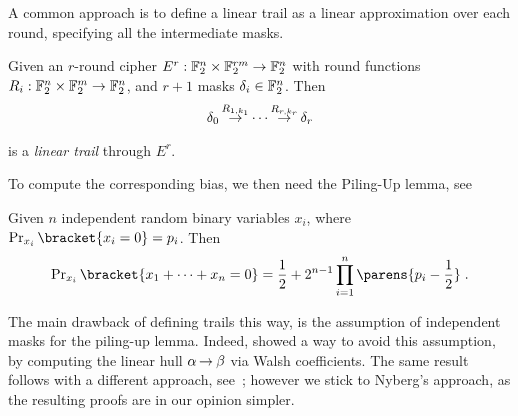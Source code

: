 A common approach is to define a linear trail as a linear approximation over each round, specifying all the intermediate masks.
\begin{definition}
    Given an $r$-round cipher $E^r : \mathbb{F}_2^n \times \mathbb{F}_2^{rm} \to \mathbb{F}_2^n$ with round functions $R_i : \mathbb{F}_2^n \times \mathbb{F}_2^m \to \mathbb{F}_2^n$, and $r+1$ masks $\delta_i \in \mathbb{F}_2^n$.
    Then
    \begin{equation*}
        \delta_0 \operatorname*{\rightarrow}^{R_{1,k_1}}_{} \cdots \operatorname*{\rightarrow}^{R_{r,k_r}}_{} \delta_{r}
    \end{equation*}
    is a \emph{linear trail} through $E^r$.
\end{definition}
To compute the corresponding bias, we then need the Piling-Up lemma, see~\cite[Lemma~3]{EC:Matsui93}
\begin{lemma}[Piling-Up]\label{lem:piling-up}
    Given $n$ independent random binary variables $x_i$, where $\Prob_{x_i}\bracket{x_i = 0} = p_i$.
    Then
    \begin{equation*}
        \Prob_{x_i}\bracket{x_1 + \cdots + x_n = 0} = \frac{1}{2} + 2^{n-1} \prod_{i=1}^n \parens{p_i - \frac{1}{2}}\;.
    \end{equation*}
\end{lemma}
The main drawback of defining trails this way, is the assumption of independent masks for the piling-up lemma.
Indeed, \textcite{EC:Nyberg93} showed a way to avoid this assumption, by computing the linear hull $\alpha \operatorname*{\rightarrow}^{}_{} \beta$ via Walsh coefficients.
The same result follows with a different approach, see~\cite{PhD:Daemen95,rijndael_book,FSE:DaeGovVan94}; however we stick to Nyberg's approach, as the resulting proofs are in our opinion simpler.

